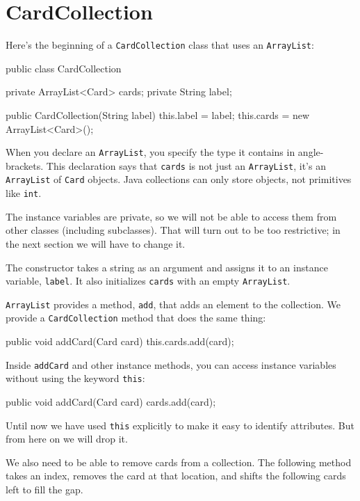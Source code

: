 \documentclass[12pt]{book}
\theoremstyle{exercise}
\newcommand{\java}[1]{\verb"#1"}
\begin{document}
\section{CardCollection}

Here's the beginning of a \java{CardCollection} class that uses an \java{ArrayList}:

\begin{code}
public class CardCollection {

    private ArrayList<Card> cards;
    private String label;

    public CardCollection(String label) {
        this.label = label;
        this.cards = new ArrayList<Card>();
    }
}
\end{code}

When you declare an \java{ArrayList}, you specify the type it contains in angle-brackets.
This declaration says that \java{cards} is not just an \java{ArrayList}, it's an \java{ArrayList} of \java{Card} objects.
Java collections can only store objects, not primitives like \java{int}.

The instance variables are private, so we will not be able to access them from other classes (including subclasses).
That will turn out to be too restrictive; in the next section we will have to change it.

The constructor takes a string as an argument and assigns it to an instance variable, \java{label}.
It also initializes \java{cards} with an empty \java{ArrayList}.

\java{ArrayList} provides a method, \java{add}, that adds an element to the collection.
We provide a \java{CardCollection} method that does the same thing:

\begin{code}
    public void addCard(Card card) {
        this.cards.add(card);
    }
\end{code}

Inside \java{addCard} and other instance methods, you can access instance variables without using the keyword \java{this}:

\begin{code}
    public void addCard(Card card) {
        cards.add(card);
    }
\end{code}

Until now we have used \java{this} explicitly to make it easy to identify attributes.
But from here on we will drop it.

We also need to be able to remove cards from a collection.
The following method takes an index, removes the card at that location, and shifts the following cards left to fill the gap.
\end{document}
